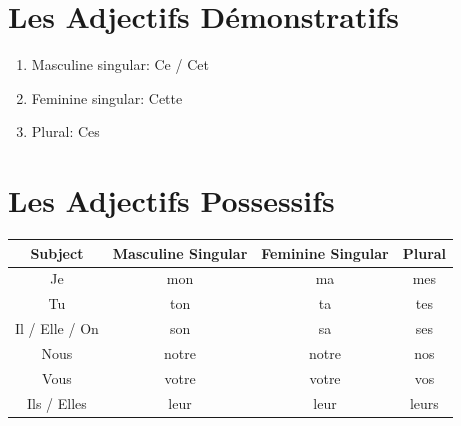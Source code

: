 \documentclass{book}
\begin{document}
    \section{Les Adjectifs Démonstratifs}
        \begin{enumerate}
            \item Masculine singular: Ce / Cet
            \item Feminine singular: Cette
            \item Plural: Ces
        \end{enumerate}

    \section{Les Adjectifs Possessifs}
        \begin{center}
            \begin{tabular}{|c|c|c|c|}
                \hline
                \textbf{Subject} & \textbf{Masculine Singular} & \textbf{Feminine Singular} & \textbf{Plural}\\
                \hline
                Je & mon & ma & mes\\
                \hline
                Tu & ton & ta & tes\\
                \hline
                Il / Elle / On & son & sa & ses\\
                \hline
                Nous & notre & notre & nos\\
                \hline
                Vous & votre & votre & vos\\
                \hline
                Ils / Elles & leur & leur & leurs\\
                \hline
            \end{tabular}
        \end{center}
\end{document}
